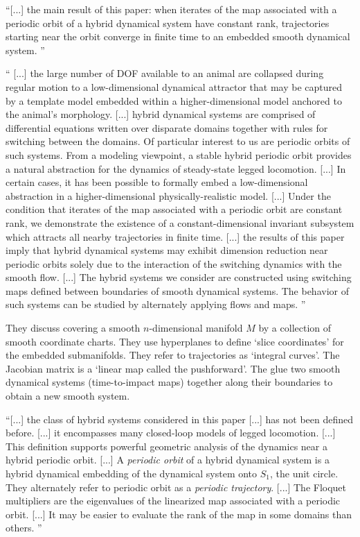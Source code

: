 \begin{description}
``[...]
the main result of this paper: when
iterates of the \Poincare map associated with a periodic orbit
of a hybrid dynamical system have constant rank, trajectories
starting near the orbit converge in finite time to an embedded
smooth dynamical system.
''

``
[...]
the large number of DOF available to an animal are collapsed
during regular motion to a low-dimensional dynamical attractor
that may be captured by a template model embedded
within a higher-dimensional model anchored to the animal's
morphology.
[...]
hybrid
dynamical systems are comprised of differential equations
written over disparate domains together with rules for switching
between the domains. Of particular interest to us are
periodic orbits of such systems. From a modeling viewpoint,
a stable hybrid periodic orbit provides a natural abstraction
for the dynamics of steady-state legged locomotion.
[...]
In certain cases, it has
been possible to formally embed a low-dimensional abstraction
in a higher-dimensional physically-realistic model.
[...]
Under the condition that iterates of the \Poincare map associated with a periodic orbit are constant rank,
we demonstrate the existence of a constant-dimensional
invariant subsystem which attracts all nearby trajectories in
finite time.
[...]
the results of this paper
imply that hybrid dynamical systems may exhibit dimension
reduction near periodic orbits solely due to the interaction
of the switching dynamics with the smooth flow.
[...]
The hybrid systems we consider are constructed using
switching maps defined between boundaries of smooth dynamical
systems. The behavior of such systems can be
studied by alternately applying flows and maps.
''

                                                \toCB
They discuss covering a smooth $n$-dimensional manifold $M$ by a
collection of smooth coordinate charts. They use hyperplanes to define
`slice coordinates' for the embedded submanifolds. They refer to
trajectories as `integral curves'. The Jacobian matrix is a `linear map
called the pushforward'. The glue two smooth dynamical systems
(time-to-impact maps) together along their boundaries to obtain a new
smooth system.


``[...]
the class of hybrid systems considered in this paper
[...]
has not been defined before.
[...]
it encompasses many closed-loop models of legged locomotion.
[...]
This definition supports powerful geometric analysis of the dynamics near
a hybrid periodic orbit.
[...]
A \emph{periodic orbit} of a hybrid dynamical system is a hybrid
dynamical embedding  of the dynamical system onto $S_1$, the unit circle.
                                                \toCB
They alternately refer to {periodic orbit} as a \emph{periodic trajectory}.
[...]
The Floquet multipliers are the eigenvalues of the linearized
\Poincare map associated with a periodic orbit.
[...]
It may be easier to evaluate the rank of the \Poincare map in some
domains than others.
''


\end{description}
